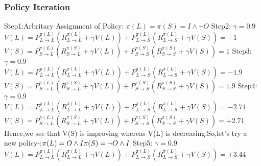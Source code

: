 \documentclass{article}
\begin{document}
\subsubsection{Policy Iteration}
Step1:Arbritary Assignment of Policy: $\pi (L)=\pi(S)=I\land\neg O$\newline\newline
Step2: $\gamma=0.9$\newline\newline
$V(L)=P_{L\to L}^{\pi(L)}(R_{L\to L}^{\pi(L)}+\gamma V(L))+P_{L\to S}^{\pi(L)}(R_{L\to S}^{\pi(L)}+\gamma V(S))=-1$\newline\newline
$V(S)=P_{S\to L}^{\pi(L)}(R_{S\to L}^{\pi(S)}+\gamma V(L))+P_{S\to S}^{\pi(S)}(R_{S\to S}^{\pi(S)}+\gamma V(S))=1$\newline\newline
Step3: $\gamma=0.9$\newline\newline
$V(L)=P_{L\to L}^{\pi(L)}(R_{L\to L}^{\pi(L)}+\gamma V(L))+P_{L\to S}^{\pi(L)}(R_{L\to S}^{\pi(L)}+\gamma V(S))=-1.9$\newline\newline
$V(S)=P_{S\to L}^{\pi(L)}(R_{S\to L}^{\pi(S)}+\gamma V(L))+P_{S\to S}^{\pi(S)}(R_{S\to S}^{\pi(S)}+\gamma V(S))=1.9$\newline\newline
Step4: $\gamma=0.9$\newline\newline
$V(L)=P_{L\to L}^{\pi(L)}(R_{L\to L}^{\pi(L)}+\gamma V(L))+P_{L\to S}^{\pi(L)}(R_{L\to S}^{\pi(L)}+\gamma V(S))=-2.71$\newline\newline
$V(S)=P_{S\to L}^{\pi(L)}(R_{S\to L}^{\pi(S)}+\gamma V(L))+P_{S\to S}^{\pi(S)}(R_{S\to S}^{\pi(S)}+\gamma V(S))=+2.71$\newline\newline
Hence,we see that V(S) is improving whereas V(L) is decreasing.So,let's try a new policy-:\newline\newline$\pi(L)=O \land I \newline\newline \pi(S)=\neg O \land I $\newline\newline
Step5: $\gamma=0.9$\newline\newline
$V(L)=P_{L\to L}^{\pi(L)}(R_{L\to L}^{\pi(L)}+\gamma V(L))+P_{L\to S}^{\pi(L)}(R_{L\to S}^{\pi(L)}+\gamma V(S))=+3.44$\newline\newline
\end{document}

